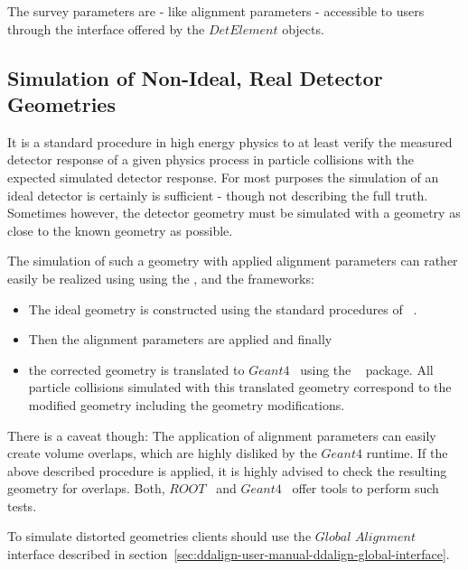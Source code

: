 \documentclass[10pt,a4paper]{article}
\begin{document}
\noindent 
The survey parameters are - like alignment parameters - accessible to users
through the interface offered by the $DetElement$ objects.


\subsection{Simulation of Non-Ideal, Real Detector Geometries}
\label{subsect:ddalign-intro-simulate-misaligned-geometries}
\noindent
It is a standard procedure in high energy physics to at least verify 
the measured detector response of a given physics process in particle 
collisions with the expected simulated detector response.
For most purposes the simulation of an ideal detector is certainly is
sufficient - though not describing the full truth. Sometimes however, the
detector geometry must be simulated with a geometry as close to the 
known geometry as possible.

\noindent
The simulation of such a geometry with applied alignment parameters can 
rather easily be realized using using the \DDhep, \DDA and the \DDG frameworks:
\begin{itemize}\itemcompact
\item The ideal geometry is constructed using the standard procedures
    of \DDhep~\cite{bib:DD4hep}.
\item Then the alignment parameters are applied and finally
\item the corrected geometry is translated to $Geant4$~\cite{bib:geant4}
    using the \DDG~\cite{bib:DDG4} package.
    All particle collisions simulated with this translated geometry 
    correspond to the modified geometry including the geometry
    modifications.
\end{itemize}
There is a caveat though: The application of alignment parameters can
easily create volume overlaps, which are highly disliked by the $Geant4$ 
runtime. If the above described procedure is applied, it is highly advised 
to check the resulting geometry for overlaps. Both, 
$ROOT$~\cite{bib:ROOT-tgeo} and $Geant4$~\cite{bib:geant4} offer tools 
to perform such tests.

\noindent
To simulate distorted geometries clients should use the 
$Global$ $Alignment$  interface described in 
section~\ref{sec:ddalign-user-manual-ddalign-global-interface}.

\newpage
\end{document}
